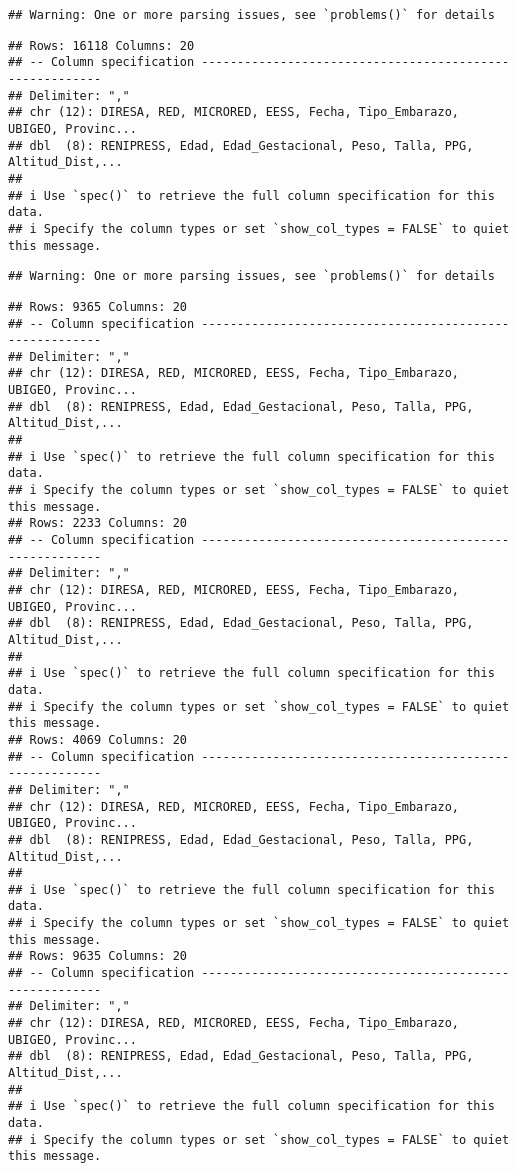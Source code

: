 \documentclass[
]{article}
\begin{document}
\begin{verbatim}
## Warning: One or more parsing issues, see `problems()` for details
\end{verbatim}

\begin{verbatim}
## Rows: 16118 Columns: 20
## -- Column specification --------------------------------------------------------
## Delimiter: ","
## chr (12): DIRESA, RED, MICRORED, EESS, Fecha, Tipo_Embarazo, UBIGEO, Provinc...
## dbl  (8): RENIPRESS, Edad, Edad_Gestacional, Peso, Talla, PPG, Altitud_Dist,...
## 
## i Use `spec()` to retrieve the full column specification for this data.
## i Specify the column types or set `show_col_types = FALSE` to quiet this message.
\end{verbatim}

\begin{verbatim}
## Warning: One or more parsing issues, see `problems()` for details
\end{verbatim}

\begin{verbatim}
## Rows: 9365 Columns: 20
## -- Column specification --------------------------------------------------------
## Delimiter: ","
## chr (12): DIRESA, RED, MICRORED, EESS, Fecha, Tipo_Embarazo, UBIGEO, Provinc...
## dbl  (8): RENIPRESS, Edad, Edad_Gestacional, Peso, Talla, PPG, Altitud_Dist,...
## 
## i Use `spec()` to retrieve the full column specification for this data.
## i Specify the column types or set `show_col_types = FALSE` to quiet this message.
## Rows: 2233 Columns: 20
## -- Column specification --------------------------------------------------------
## Delimiter: ","
## chr (12): DIRESA, RED, MICRORED, EESS, Fecha, Tipo_Embarazo, UBIGEO, Provinc...
## dbl  (8): RENIPRESS, Edad, Edad_Gestacional, Peso, Talla, PPG, Altitud_Dist,...
## 
## i Use `spec()` to retrieve the full column specification for this data.
## i Specify the column types or set `show_col_types = FALSE` to quiet this message.
## Rows: 4069 Columns: 20
## -- Column specification --------------------------------------------------------
## Delimiter: ","
## chr (12): DIRESA, RED, MICRORED, EESS, Fecha, Tipo_Embarazo, UBIGEO, Provinc...
## dbl  (8): RENIPRESS, Edad, Edad_Gestacional, Peso, Talla, PPG, Altitud_Dist,...
## 
## i Use `spec()` to retrieve the full column specification for this data.
## i Specify the column types or set `show_col_types = FALSE` to quiet this message.
## Rows: 9635 Columns: 20
## -- Column specification --------------------------------------------------------
## Delimiter: ","
## chr (12): DIRESA, RED, MICRORED, EESS, Fecha, Tipo_Embarazo, UBIGEO, Provinc...
## dbl  (8): RENIPRESS, Edad, Edad_Gestacional, Peso, Talla, PPG, Altitud_Dist,...
## 
## i Use `spec()` to retrieve the full column specification for this data.
## i Specify the column types or set `show_col_types = FALSE` to quiet this message.
\end{verbatim}
\end{document}

